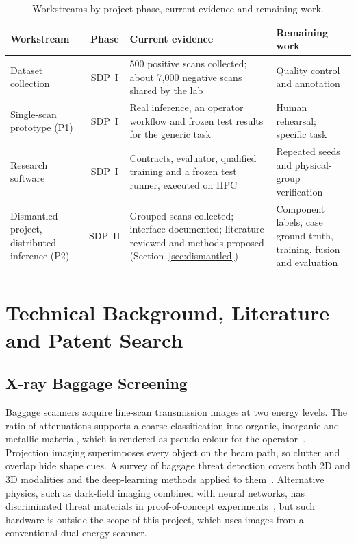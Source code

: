 \begin{table}[htbp]
\centering\tablesetup
\caption{Workstreams by project phase, current evidence and remaining work.}
\label{tab:scope}
\begin{tabularx}{\textwidth}{@{}L{0.2\textwidth}cYY@{}}
\toprule
Workstream & Phase & Current evidence & Remaining work\\
\midrule
Dataset collection & SDP~I & 500 positive scans collected; about 7,000 negative
scans shared by the lab & Quality control and annotation\\
Single-scan prototype (P1) & SDP~I & Real inference, an operator workflow and
frozen test results for the generic task & Human rehearsal; specific task\\
Research software & SDP~I & Contracts, evaluator, qualified training and a frozen
test runner, executed on HPC & Repeated seeds and physical-group verification\\
Dismantled project, distributed inference (P2) & SDP~II & Grouped scans
collected; interface documented; literature reviewed and methods proposed
(Section~\ref{sec:dismantled}) & Component labels, case ground truth, training, fusion
and evaluation\\
\bottomrule
\end{tabularx}
\end{table}

\section{Technical Background, Literature and Patent Search}
\label{sec:background}

\subsection{X-ray Baggage Screening}
Baggage scanners acquire line-scan transmission images at two energy levels. The
ratio of attenuations supports a coarse classification into organic, inorganic and
metallic material, which is rendered as pseudo-colour for the
operator~\citep{wells2012review}. Projection imaging superimposes every object on
the beam path, so clutter and overlap hide shape cues. A survey of baggage threat
detection covers both 2D and 3D modalities and the deep-learning methods applied to
them~\citep{velayudhan2023survey}. Alternative physics, such as dark-field
imaging combined with neural networks, has discriminated threat materials in
proof-of-concept experiments~\citep{astolfo2022darkfield}, but such hardware is
outside the scope of this project, which uses images from a conventional
dual-energy scanner.

